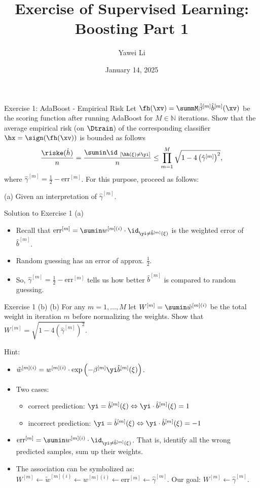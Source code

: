\documentclass[aspectratio=169]{beamer}
\title[]{\textbf{Exercise of Supervised Learning: \\ Boosting Part 1}}
\author{Yawei Li}
\institute[LMU]
{
\\
  \texttt{yawei.li@stat.uni-muenchen.de}
}
\date{January 14, 2025}
\newcommand{\betahm}{\hat{\beta}^{[m]}}
\newcommand{\bhm}{\hat{b}^{[m]}}
\newcommand{\gammahm}{\hat{\gamma}^{[m]}}
\newcommand{\idhxneqy}{\id_{\ [\hh\left(\xi\right) \neq \yi]}}
\newcommand{\errm}{\mathrm{err}^{[m]}}
\newcommand{\prodmM}{\prod_{m=1}^M}
\newcommand{\Wm}{W^{[m]}}
\newcommand{\wmi}{w^{[m] (i)}}
\newcommand{\wtmi}{\tilde{w}^{[m](i)}}
\newcommand{\betam}{\beta^{[m]}}
\begin{document}
\begin{frame}
\titlepage

\end{frame}



\begin{frame}{Exercise 1: AdaBoost - Empirical Risk}
	Let $\fh(\xv) = \summM \betahm \bhm (\xv) $ be the scoring function after running AdaBoost for $M \in \mathbb{N}$ iterations. Show that the average empirical risk (on $\Dtrain$) of the corresponding classifier $\hx = \sign (\fh(\xv))$ is bounded as follows
	\begin{align}
		\frac{\riske (\hat{h})}{n} = \frac{\sumin \idhxneqy}{n} \leq \prodmM \sqrt{1 - 4 \left(\gammahm\right)^2},
	\end{align}
	where $\gammahm = \frac{1}{2} - \errm$. For this purpose, proceed as follows:
	
	(a) Given an interpretation of $\gammahm$.
\end{frame}

\begin{frame}{Solution to Exercise 1 (a)}
	\begin{itemize}
		\item<1-> Recall that $\errm = \sumin \wmi \cdot \id_{\yi \neq \bhm(\xi)}$ is the weighted error of $\bhm$.
		\item<2-> Random guessing has an error of approx. $\frac{1}{2}$.
		\item<3-> So, $\gammahm = \frac{1}{2} - \errm$ tells us how better $\bhm$ is compared to random guessing.
	\end{itemize}
	
\end{frame}

\begin{frame}{Exercise 1 (b)}
	(b) For any $m = 1, \ldots, M$ let $\Wm = \sumin \wtmi$ be the total weight in iteration $m$ before normalizing the weights. Show that $\Wm = \sqrt{1 - 4\left(\gammahm \right)^2}$.
	
	Hint:
	\begin{itemize}
		\item $\wtmi = \wmi \cdot \exp \left( - \betam \yi \bhm(\xi) \right)$.
		\item<2-> Two cases: 
			\begin{itemize}
				\item correct prediction: $\yi = \bhm(\xi) \Leftrightarrow \yi \cdot \bhm(\xi) = 1$
				\item incorrect prediction: $\yi = \bhm(\xi) \Leftrightarrow \yi \cdot \bhm(\xi) = -1$
			\end{itemize}
		\item<3-> $\errm = \sumin \wmi \cdot \id_{\yi \neq \bhm(\xi)}$. That is, identify all the wrong predicted samples, sum up their weights.
		\item<4-> The association can be symbolized as: $\Wm \leftarrow \wtmi \leftarrow \wmi \leftarrow \errm \leftarrow \gammahm$. Our goal: $\Wm \leftarrow \gammahm$.
	\end{itemize}
\end{frame}
\end{document}

